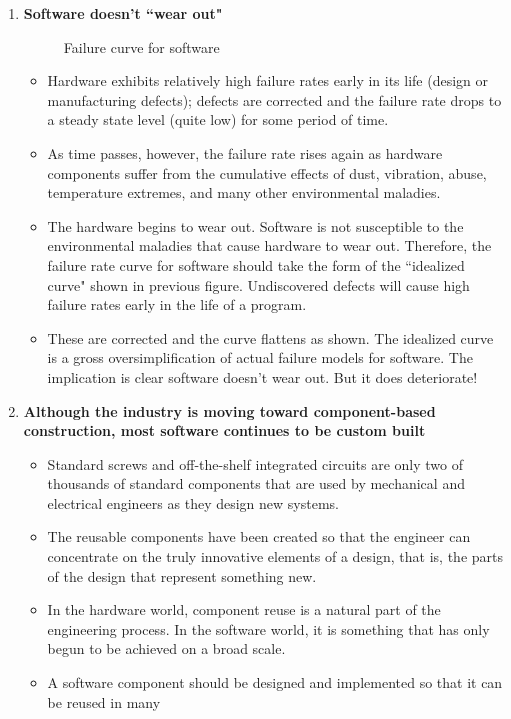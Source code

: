 \documentclass{article}
\begin{document}
\begin{enumerate}[label=\arabic*.]
		\item \textbf{Software doesn't ``wear out"}
			\begin{figure}[H]
				\centering
				
				\caption{Failure curve for software}
			\end{figure}
			\begin{itemize}
				\item Hardware exhibits relatively high failure rates early in its life (design or manufacturing
					defects); defects are corrected and the failure rate drops to a steady state level (quite
					low) for some period of time.
				\item As time passes, however, the failure rate rises again as hardware components suffer from
					the cumulative effects of dust, vibration, abuse, temperature extremes, and many other
					environmental maladies.
				\item The hardware begins to wear out. Software is not susceptible to the
					environmental maladies that cause hardware to wear out. Therefore, the failure rate curve
					for software should take the form of the ``idealized curve" shown in previous figure.
					Undiscovered defects will cause high failure rates early in the life of a program.
				\item These are corrected and the curve flattens as shown. The idealized curve is a gross
					oversimplification of actual failure models for software.
					The implication is clear software doesn't wear out. But it does deteriorate!
			\end{itemize}
		\item \textbf{
			Although the industry is moving toward component-based construction, most software continues to be
			custom built
		}
		\begin{itemize}
			\item Standard screws and off-the-shelf integrated circuits are only two of thousands of standard
				components that are used by mechanical and electrical engineers as they design new systems.
			\item The reusable components have been created so that the engineer can concentrate on the truly
				innovative elements of a design, that is, the parts of the design that represent something new. 			\item In the hardware world, component reuse is a natural part of the engineering process.
				In the software world, it is something that has only begun to be achieved on a broad scale.
			\item A software component should be designed and implemented so that it can be reused in many

\end{itemize}
\end{enumerate}
\end{document}
